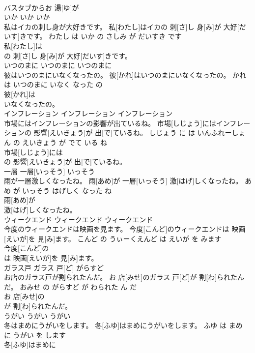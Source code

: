 \documentclass[8pt]{extreport}
\begin{document}
\begin{CJK}{UTF8}{min}
\\	バスタブからお 湯[ゆ]が
\\	いか	いか	いか	
\\	私はイカの刺し身が大好きです。	私[わたし]はイカの 刺[さ]し 身[み]が 大好[だいす]きです。	わたし は いか の さしみ が だいすき です	
\\	私[わたし]は
\\	の 刺[さ]し 身[み]が 大好[だいす]きです。			
\\	いつのまに	いつのまに	いつのまに	
\\	彼はいつのまにいなくなったの。	彼[かれ]はいつのまにいなくなったの。	かれ は いつのまに いなく なった の	
\\	彼[かれ]は
\\	いなくなったの。			
\\	インフレーション	インフレーション	インフレーション	
\\	市場にはインフレーションの影響が出ているね。	市場[しじょう]にはインフレーションの 影響[えいきょう]が 出[で]ているね。	しじょう に は いんふれーしょん の えいきょう が でて いる ね	
\\	市場[しじょう]には
\\	の 影響[えいきょう]が 出[で]ているね。			
\\	一層	一層[いっそう]	いっそう	
\\	雨が一層激しくなったね。	雨[あめ]が 一層[いっそう] 激[はげ]しくなったね。	あめ が いっそう はげしく なった ね	
\\	雨[あめ]が
\\	激[はげ]しくなったね。			
\\	ウィークエンド	ウィークエンド	ウィークエンド	
\\	今度のウィークエンドは映画を見ます。	今度[こんど]のウィークエンドは 映画[えいが]を 見[み]ます。	こんど の うぃーくえんど は えいが を みます	
\\	今度[こんど]の
\\	は 映画[えいが]を 見[み]ます。			
\\	ガラス戸	ガラス 戸[ど]	がらすど	
\\	お店のガラス戸が割られたんだ。	お 店[みせ]のガラス 戸[ど]が 割[わ]られたんだ。	おみせ の がらすど が わられた ん だ	
\\	お 店[みせ]の
\\	が 割[わ]られたんだ。			
\\	うがい	うがい	うがい	
\\	冬はまめにうがいをします。	冬[ふゆ]はまめにうがいをします。	ふゆ は まめ に うがい を します	
\\	冬[ふゆ]はまめに

\end{CJK}
\end{document}
